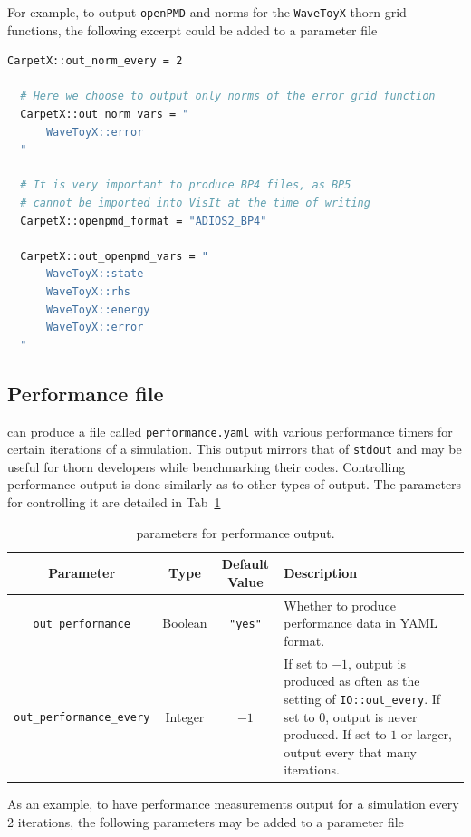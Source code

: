 For example, to output \texttt{openPMD} and norms for the \texttt{WaveToyX} thorn grid functions, the following excerpt could be added to a parameter file

\begin{lstlisting}[language=bash]
  CarpetX::out_norm_every = 2
  
  # Here we choose to output only norms of the error grid function    
  CarpetX::out_norm_vars = "
      WaveToyX::error
  "

  # It is very important to produce BP4 files, as BP5
  # cannot be imported into VisIt at the time of writing
  CarpetX::openpmd_format = "ADIOS2_BP4"
  
  CarpetX::out_openpmd_vars = "
      WaveToyX::state
      WaveToyX::rhs
      WaveToyX::energy
      WaveToyX::error
  "
\end{lstlisting}

\subsection{Performance file}

\CarpetX\space can produce a file called \texttt{performance.yaml} with various performance timers for certain iterations of a simulation. This output mirrors that of \texttt{stdout} and may be useful for thorn developers while benchmarking their codes. Controlling performance output is done similarly as to other types of output. The parameters for controlling it are detailed in Tab~\ref{tab:perf_output}

\begin{table}[ht]
  \centering
  \begin{tabularx}{\textwidth}{cccX}
    Parameter                       & Type     & Default Value  & Description \\\hline\hline
    \texttt{out\_performance}        & Boolean & \texttt{"yes"} & Whether to produce performance data in YAML format. \\
    \texttt{out\_performance\_every} & Integer & $-1$           & If set to $-1$, output is produced as often as the setting of \texttt{IO::out\_every}. If set to $0$, output is never produced. If set to $1$ or larger, output every that many iterations. \\\hline\hline
  \end{tabularx}
  \label{tab:perf_output}
  \caption{\CarpetX\space parameters for performance output.}
\end{table}

As an example, to  have performance measurements output for a simulation every 2 iterations, the following parameters may be added to a parameter file

